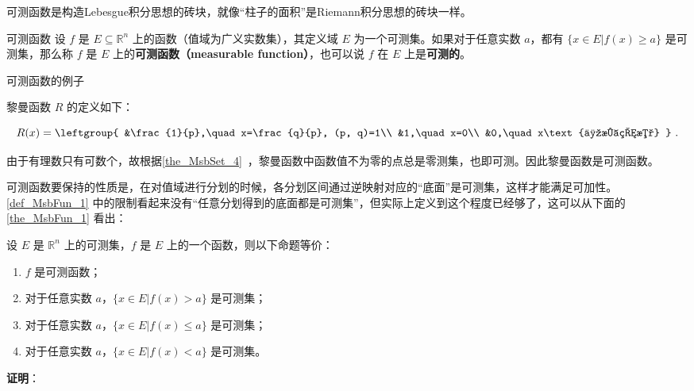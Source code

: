 可测函数是构造Lebesgue积分思想的砖块，就像“柱子的面积”是Riemann积分思想的砖块一样。

\begin{definition}{可测函数}\label{def_MsbFun_1}
设 $f$ 是 $E\subseteq\mathbb{R}^n$ 上的函数（值域为广义实数集），其定义域 $E$ 为一个可测集。如果对于任意实数 $a$，都有 $\{x\in E|f(x)\geq a\}$ 是可测集，那么称 $f$ 是 $E$ 上的\textbf{可测函数（measurable function）}，也可以说 $f$ 在 $E$ 上是\textbf{可测的}。
\end{definition}

\begin{example}{可测函数的例子}

黎曼函数 $R$ 的定义如下：

\begin{equation}
R(x)=
\leftgroup{
        &\frac{1}{p},\quad x=\frac{q}{p}, (p, q)=1\\
        &1,\quad x=0\\
        &0,\quad x\text{为无理数}
}~.
\end{equation}

由于有理数只有可数个，故根据\autoref{the_MsbSet_4}~，黎曼函数中函数值不为零的点总是零测集，也即可测。因此黎曼函数是可测函数。

\end{example}









可测函数要保持的性质是，在对值域进行分划的时候，各分划区间通过逆映射对应的“底面”是可测集，这样才能满足可加性。\autoref{def_MsbFun_1} 中的限制看起来没有“任意分划得到的底面都是可测集”，但实际上定义到这个程度已经够了，这可以从下面的\autoref{the_MsbFun_1} 看出：


\begin{theorem}{}\label{the_MsbFun_1}
设 $E$ 是 $\mathbb{R}^n$ 上的可测集，$f$ 是 $E$ 上的一个函数，则以下命题等价：
\begin{enumerate}
\item $f$ 是可测函数；
\item 对于任意实数 $a$，$\{x\in E|f(x)>a\}$ 是可测集；
\item 对于任意实数 $a$，$\{x\in E|f(x)\leq a\}$ 是可测集；
\item 对于任意实数 $a$，$\{x\in E|f(x)<a\}$ 是可测集。
\end{enumerate}
\end{theorem}

\textbf{证明}：

